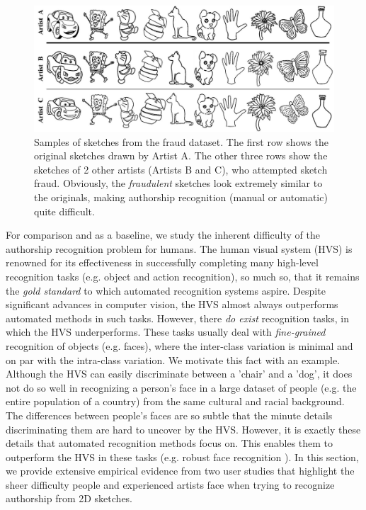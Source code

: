 \begin{figure}[htbp!]
\centering
\includegraphics[width = 1.0\textwidth]{images/fraudExperiment.jpg}
\vspace{-6mm}\caption {Samples of sketches from the fraud dataset. The first row shows the original sketches drawn by Artist A. The other three rows show the sketches of 2 other artists (Artists B and C), who attempted  sketch fraud. Obviously, the \emph{fraudulent} sketches look extremely similar to the originals, making authorship recognition (manual or automatic) quite difficult.}\vspace{-5mm}
\label{FraudDataset}
\end{figure}

For comparison and as a baseline, we study the inherent difficulty of the authorship recognition problem for humans. The human visual system (HVS) is renowned for its effectiveness in successfully completing many high-level recognition tasks (e.g. object and action recognition), so much so, that it remains the \emph{gold standard} to which automated recognition systems aspire. Despite significant advances in computer vision, the HVS almost always outperforms automated methods in such tasks. However, there \emph{do exist} recognition tasks, in which the HVS underperforms. These tasks usually deal with \emph{fine-grained} recognition of objects (e.g. faces), where the inter-class variation is minimal and on par with the intra-class variation. We motivate this fact with an example. Although the HVS can easily discriminate between a 'chair' and a 'dog', it does not do so well in recognizing a person's face in a large dataset of people (e.g. the entire population of a country) from the same cultural and racial background. The differences between people's faces are so subtle that the minute details discriminating them are hard to uncover by the HVS. However, it is exactly these details that automated recognition methods focus on. This enables them to outperform the HVS in these tasks (e.g. robust face recognition \cite{4483511}). In this section, we provide extensive empirical evidence from two user studies that highlight the sheer difficulty people and experienced artists face when trying to recognize authorship from 2D sketches.%

